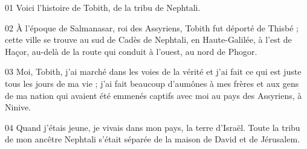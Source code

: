 01 Voici l’histoire de Tobith, de la tribu de Nephtali.

02 À l’époque de Salmanasar, roi des Assyriens, Tobith fut déporté de Thisbé ; cette ville se trouve au sud de Cadès de Nephtali, en Haute-Galilée, à l’est de Haçor, au-delà de la route qui conduit à l’ouest, au nord de Phogor.

03 Moi, Tobith, j’ai marché dans les voies de la vérité et j’ai fait ce qui est juste tous les jours de ma vie ; j’ai fait beaucoup d’aumônes à mes frères et aux gens de ma nation qui avaient été emmenés captifs avec moi au pays des Assyriens, à Ninive.

04 Quand j’étais jeune, je vivais dans mon pays, la terre d’Israël. Toute la tribu de mon ancêtre Nephtali s’était séparée de la maison de David et de Jérusalem.
